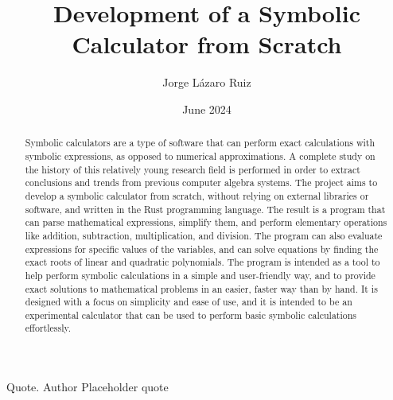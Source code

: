 \documentclass[en]{uc3mthesisIEEE}
\title{Development of a Symbolic Calculator from Scratch}
\author{Jorge Lázaro Ruiz}
\date{June 2024}
\begin{document}
  \makecover

  \makeepigraph
    {Quote.}  %
    {Author}  %
    {Placeholder quote}  %


  \begin{abstract}
    Symbolic calculators are a type of software that can perform exact calculations with symbolic expressions, as opposed to numerical approximations. A complete study on the history of this relatively young research field is performed in order to extract conclusions and trends from previous computer algebra systems. The project aims to develop a symbolic calculator from scratch, without relying on external libraries or software, and written in the Rust programming language. The result is a program that can parse mathematical expressions, simplify them, and perform elementary operations like addition, subtraction, multiplication, and division. The program can also evaluate expressions for specific values of the variables, and can solve equations by finding the exact roots of linear and quadratic polynomials. The program is intended as a tool to help perform symbolic calculations in a simple and user-friendly way, and to provide exact solutions to mathematical problems in an easier, faster way than by hand. It is designed with a focus on simplicity and ease of use, and it is intended to be an experimental calculator that can be used to perform basic symbolic calculations effortlessly.
  \end{abstract}


  \begin{acknowledgements}
  \end{acknowledgements}


  \tableofcontents
  \listoffigures
  \listoftables
  \lstlistoflistings


  \begin{thesis}
  \end{thesis}

  \cleardoublepage
  \label{bibliography}
  \printbibliography[heading=bibintoc]

  \cleardoublepage
  \label{glossary}
	\printglossaries


\end{document}
